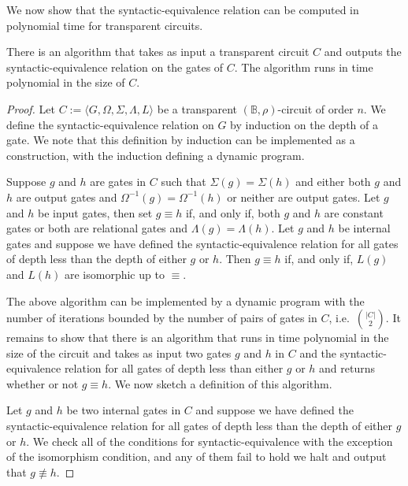 \documentclass[../paper.tex]{subfiles}
\begin{document}
We now show that the syntactic-equivalence relation can be computed in
polynomial time for transparent circuits.

\begin{lem}
  There is an algorithm that takes as input a transparent circuit $C$ and
  outputs the syntactic-equivalence relation on the gates of $C$. The algorithm
  runs in time polynomial in the size of $C$.
  \label{lem:transparent-syntactic-equiv}
\end{lem}
\begin{proof}
  Let $C := \langle G, \Omega, \Sigma, \Lambda, L \rangle$ be a transparent
  $(\mathbb{B}, \rho)$-circuit of order $n$. We define the syntactic-equivalence
  relation on $G$ by induction on the depth of a gate. We note that this
  definition by induction can be implemented as a construction, with the
  induction defining a dynamic program.
  
  Suppose $g$ and $h$ are gates in $C$ such that $\Sigma (g) = \Sigma(h)$ and
  either both $g$ and $h$ are output gates and $\Omega^{-1}(g) = \Omega^{-1}(h)$
  or neither are output gates. Let $g$ and $h$ be input gates, then set $g
  \equiv h$ if, and only if, both $g$ and $h$ are constant gates or both are
  relational gates and $\Lambda(g) = \Lambda (h)$. Let $g$ and $h$ be internal
  gates and suppose we have defined the syntactic-equivalence relation for all
  gates of depth less than the depth of either $g$ or $h$. Then $g \equiv h$ if,
  and only if, $L(g)$ and $L(h)$ are isomorphic up to $\equiv$.

  The above algorithm can be implemented by a dynamic program with the number of
  iterations bounded by the number of pairs of gates in $C$, i.e.\ ${\vert C
    \vert} \choose{2}$. It remains to show that there is an algorithm that runs
  in time polynomial in the size of the circuit and takes as input two gates $g$
  and $h$ in $C$ and the syntactic-equivalence relation for all gates of depth
  less than either $g$ or $h$ and returns whether or not $g \equiv h$. We now
  sketch a definition of this algorithm.
  
  Let $g$ and $h$ be two internal gates in $C$ and suppose we have defined the
  syntactic-equivalence relation for all gates of depth less than the depth of
  either $g$ or $h$. We check all of the conditions for syntactic-equivalence
  with the exception of the isomorphism condition, and any of them fail to hold
  we halt and output that $g \not\equiv h$.


\end{proof}
\end{document}

